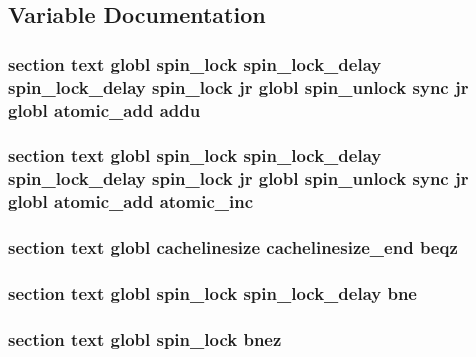 \subsection{Variable Documentation}
\hypertarget{mips_2atomic_8S_a627d01ff62291868f3241ac59b8a7877}{
\subsubsection[{addu}]{\setlength{\rightskip}{0pt plus 5cm}section text globl {\bf spin\-\_\-lock} {\bf spin\-\_\-lock\-\_\-delay} {\bf spin\-\_\-lock\-\_\-delay} {\bf spin\-\_\-lock} jr globl {\bf spin\-\_\-unlock} sync jr globl {\bf atomic\-\_\-add} addu}}\label{mips_2atomic_8S_a627d01ff62291868f3241ac59b8a7877}
\hypertarget{mips_2atomic_8S_a9b3c74d39013e68e14a07125b6bf05cf}{
\subsubsection[{atomic\-\_\-inc}]{\setlength{\rightskip}{0pt plus 5cm}section text globl {\bf spin\-\_\-lock} {\bf spin\-\_\-lock\-\_\-delay} {\bf spin\-\_\-lock\-\_\-delay} {\bf spin\-\_\-lock} jr globl {\bf spin\-\_\-unlock} sync jr globl {\bf atomic\-\_\-add} atomic\-\_\-inc}}\label{mips_2atomic_8S_a9b3c74d39013e68e14a07125b6bf05cf}
\hypertarget{mips_2atomic_8S_ae8f5e5b3e81e22b99c4bd415ca4da91d}{
\subsubsection[{beqz}]{\setlength{\rightskip}{0pt plus 5cm}section text globl {\bf cachelinesize} {\bf cachelinesize\-\_\-end} beqz}}\label{mips_2atomic_8S_ae8f5e5b3e81e22b99c4bd415ca4da91d}
\hypertarget{mips_2atomic_8S_a9ec95c7fd8fc070fa2890d194d38af79}{
\subsubsection[{bne}]{\setlength{\rightskip}{0pt plus 5cm}section text globl {\bf spin\-\_\-lock} {\bf spin\-\_\-lock\-\_\-delay} bne}}\label{mips_2atomic_8S_a9ec95c7fd8fc070fa2890d194d38af79}
\hypertarget{mips_2atomic_8S_ac90faece1c7b2fe2dcf10741e4322281}{
\subsubsection[{bnez}]{\setlength{\rightskip}{0pt plus 5cm}section text globl {\bf spin\-\_\-lock} bnez}}\label{mips_2atomic_8S_ac90faece1c7b2fe2dcf10741e4322281}

